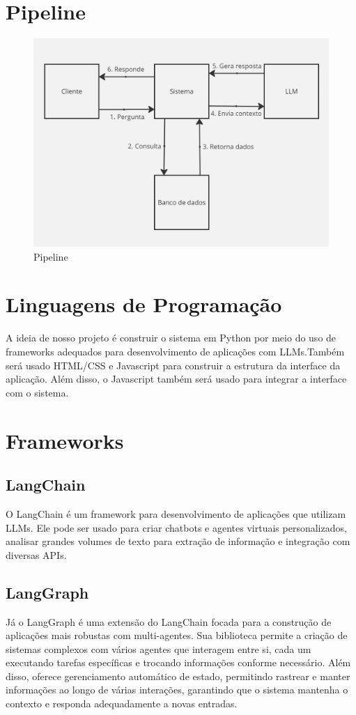 \documentclass[
	12pt,				%
	openright,			%
	oneside,			    %
	a4paper,				%
	english,			%
	french,			%
	spanish,			%
	brazil			%
	]{abntex2}
\begin{document}
\clearpage
\section{Pipeline}

\begin{figure}[h]
    \centering
    \includegraphics[width=0.8\linewidth]{Pipeline.jpg}
    \caption{Pipeline}
    \label{fig:enter-label}
\end{figure}

\section{Linguagens de Programação}
A ideia de nosso projeto é construir o sistema em Python por meio do uso de frameworks adequados para desenvolvimento de aplicações com LLMs.Também será usado HTML/CSS e Javascript para construir a estrutura da interface da aplicação. Além disso, o Javascript também será usado para integrar a interface com o sistema.


\section{Frameworks}
    \subsection{LangChain}
    O LangChain é um framework para desenvolvimento de aplicações que utilizam LLMs. Ele pode ser usado para criar chatbots e agentes virtuais personalizados, analisar grandes volumes de texto para extração de informação e integração com diversas APIs.
    

    \subsection{LangGraph}
    Já o LangGraph é uma extensão do LangChain focada para a construção de aplicações mais robustas com multi-agentes. Sua biblioteca permite a criação de sistemas complexos com vários agentes que interagem entre si, cada um executando tarefas específicas e trocando informações conforme necessário. Além disso, oferece gerenciamento automático de estado, permitindo rastrear e manter informações ao longo de várias interações, garantindo que o sistema mantenha o contexto e responda adequadamente a novas entradas.
\end{document}
